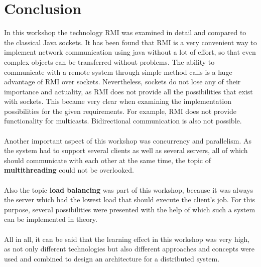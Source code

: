 \chapter{Conclusion}
\label{conclusion}
In this workshop the technology RMI was examined in detail and compared to the classical Java sockets. It has been found that RMI is a very convenient way to implement network communication using java without a lot of effort, so that even complex objects can be transferred without problems. The ability to communicate with a remote system through simple method calls is a huge advantage of RMI over sockets. Nevertheless, sockets do not lose any of their importance and actuality, as RMI does not provide all the possibilities that exist with sockets. This became very clear when examining the implementation possibilities for the given requirements. For example, RMI does not provide functionality for multicasts. Bidirectional communication is also not possible.
\\\\
Another important aspect of this workshop was concurrency and parallelism. As the system had to support several clients as well as several servers, all of which should communicate with each other at the same time, the topic of \textbf{multithreading} could not be overlooked. 
\\\\
Also the topic \textbf{load balancing} was part of this workshop, because it was always the server which had the lowest load that should execute the client's job. For this purpose, several possibilities were presented with the help of which such a system can be implemented in theory.
\\\\
All in all, it can be said that the learning effect in this workshop was very high, as not only different technologies but also different approaches and concepts were used and combined to design an architecture for a distributed system.